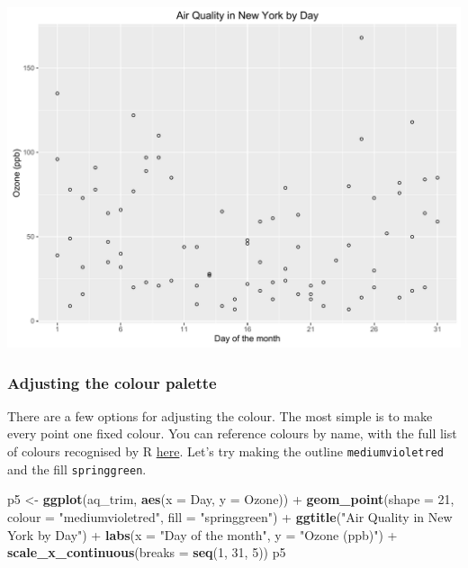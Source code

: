 \documentclass[]{article}
\newenvironment{Shaded}{\begin{snugshade}}{\end{snugshade}}
\newcommand{\KeywordTok}[1]{\textcolor[rgb]{0.13,0.29,0.53}{\textbf{{#1}}}}
\newcommand{\DataTypeTok}[1]{\textcolor[rgb]{0.13,0.29,0.53}{{#1}}}
\newcommand{\DecValTok}[1]{\textcolor[rgb]{0.00,0.00,0.81}{{#1}}}
\newcommand{\StringTok}[1]{\textcolor[rgb]{0.31,0.60,0.02}{{#1}}}
\newcommand{\NormalTok}[1]{{#1}}
\begin{document}
\begin{center}\includegraphics{0_all_posts_pdf/scatter_4-1} \end{center}

\subsubsection{Adjusting the colour
palette}\label{adjusting-the-colour-palette}

There are a few options for adjusting the colour. The most simple is to
make every point one fixed colour. You can reference colours by name,
with the full list of colours recognised by R
\href{http://www.stat.columbia.edu/~tzheng/files/Rcolor.pdf}{here}.
Let's try making the outline \texttt{mediumvioletred} and the fill
\texttt{springgreen}.

\begin{Shaded}
\begin{Highlighting}[]
\NormalTok{p5 <-}\StringTok{ }\KeywordTok{ggplot}\NormalTok{(aq_trim, }\KeywordTok{aes}\NormalTok{(}\DataTypeTok{x =} \NormalTok{Day, }\DataTypeTok{y =} \NormalTok{Ozone)) +}\StringTok{ }
\StringTok{      }\KeywordTok{geom_point}\NormalTok{(}\DataTypeTok{shape =} \DecValTok{21}\NormalTok{, }\DataTypeTok{colour =} \StringTok{"mediumvioletred"}\NormalTok{, }\DataTypeTok{fill =} \StringTok{"springgreen"}\NormalTok{) +}
\StringTok{      }\KeywordTok{ggtitle}\NormalTok{(}\StringTok{"Air Quality in New York by Day"}\NormalTok{) +}\StringTok{ }
\StringTok{      }\KeywordTok{labs}\NormalTok{(}\DataTypeTok{x =} \StringTok{"Day of the month"}\NormalTok{, }\DataTypeTok{y =} \StringTok{"Ozone (ppb)"}\NormalTok{) +}
\StringTok{      }\KeywordTok{scale_x_continuous}\NormalTok{(}\DataTypeTok{breaks =} \KeywordTok{seq}\NormalTok{(}\DecValTok{1}\NormalTok{, }\DecValTok{31}\NormalTok{, }\DecValTok{5}\NormalTok{)) }
\NormalTok{p5}
\end{Highlighting}
\end{Shaded}
\end{document}

